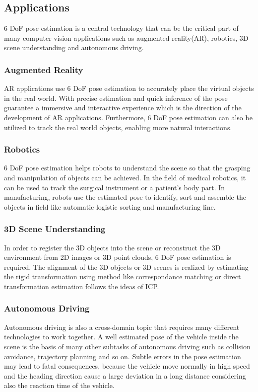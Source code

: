 \documentclass[12pt,DIV14,BCOR12mm,a4paper,footinclude=false,headinclude,parskip=half-,twoside,openright,cleardoublepage=empty,toc=index,bibliography=totoc,listof=totoc]{scrreprt}
\numberwithin{equation}{chapter}
\begin{document}
\subsection{Applications}
6 DoF pose estimation is a central technology that can be the critical part of many computer vision applications such as 
augmented reality(AR), robotics, 3D scene understanding and autonomous driving.

\subsubsection{Augmented Reality}
AR applications use 6 DoF pose estimation to accurately place the virtual objects in the real world. 
With precise estimation and quick inference of the pose guarantee a immersive and interactive experience 
which is the direction of the development of AR applications\cite{9836663}. 
Furthermore, 6 DoF pose estimation can also be utilized to track the real world objects, enabling more natural interactions.

\subsubsection{Robotics}
6 DoF pose estimation helps robots to understand the scene so that the grasping and manipulation of objects can be achieved. 
In the field of medical robotics, it can be used to track the surgical instrument or a patient's body part\cite{cao20236impose}. 
In manufacturing, robots use the estimated pose to identify, sort and assemble the objects in field like automatic logistic sorting and manufacturing line.

\subsubsection{3D Scene Understanding}
In order to register the 3D objects into the scene or reconstruct the 3D environment from 2D images or 3D point clouds, 6 DoF pose estimation is required. 
The alignment of the 3D objects or 3D scenes is realized by estimating the rigid transformation using method like correspondance matching\cite{qin2022geometric} 
or direct transformation estimation\cite{fu2021robust} follows the ideas of ICP\cite{Besl1992AMF}.

\subsubsection{Autonomous Driving}
Autonomous driving is also a cross-domain topic that requires many different technologies to work together. 
A well estimated pose of the vehicle inside the scene is the basis of many other subtasks of autonomous driving such as collision avoidance,
trajectory planning and so on. Subtle errors in the pose estimation may lead to fatal consequences\cite{auto}, because the vehicle move normally in high speed 
and the heading direction cause a large deviation in a long distance considering also the reaction time of the vehicle.
\end{document}
